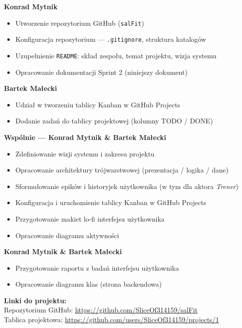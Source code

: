 \documentclass[11pt, a4paper]{article}
\newcommand{\actor}[1]{\textit{\color{secondary}#1}}
\begin{document}
\begin{tcolorbox}[donebox]
\textbf{Konrad Mytnik}
\begin{itemize}[leftmargin=*, itemsep=3pt, label=\color{done}$\checkmark$]
  \item Utworzenie repozytorium GitHub (\texttt{salFit})
  \item Konfiguracja repozytorium — \texttt{.gitignore}, struktura katalogów
  \item Uzupełnienie \texttt{README}: skład zespołu, temat projektu, wizja systemu
  \item Opracowanie dokumentacji Sprint 2 (niniejszy dokument)
\end{itemize}

\medskip
\textbf{Bartek Małecki}
\begin{itemize}[leftmargin=*, itemsep=3pt, label=\color{done}$\checkmark$]
  \item Udział w tworzeniu tablicy Kanban w GitHub Projects
  \item Dodanie zadań do tablicy projektowej (kolumny TODO / DONE)
\end{itemize}

\medskip
\textbf{Wspólnie — Konrad Mytnik \& Bartek Małecki}
\begin{itemize}[leftmargin=*, itemsep=3pt, label=\color{done}$\checkmark$]
  \item Zdefiniowanie wizji systemu i zakresu projektu
  \item Opracowanie architektury trójwarstwowej (prezentacja / logika / dane)
  \item Sformułowanie epików i historyjek użytkownika (w tym dla aktora \actor{Trener})
  \item Konfiguracja i uruchomienie tablicy Kanban w GitHub Projects
  \item Przygotowanie makiet lo-fi interfejsu użytkownika
  \item Opracowanie diagramu aktywności
\end{itemize}
\end{tcolorbox}

\bigskip

\begin{tcolorbox}[todobox]
\textbf{Konrad Mytnik \& Bartek Małecki}
\begin{itemize}[leftmargin=*, itemsep=3pt, label=\color{todo}$\triangleright$]
  \item Przygotowanie raportu z badań interfejsu użytkownika
  \item Opracowanie diagramu klas (strona backendowa)
\end{itemize}
\end{tcolorbox}

\bigskip

\begin{tcolorbox}[infobox]
\small
\textbf{Linki do projektu:}\\[4pt]
Repozytorium GitHub: \url{https://github.com/SliceOf314159/salFit}\\
Tablica projektowa: \url{https://github.com/users/SliceOf314159/projects/1}
\end{tcolorbox}
\end{document}
